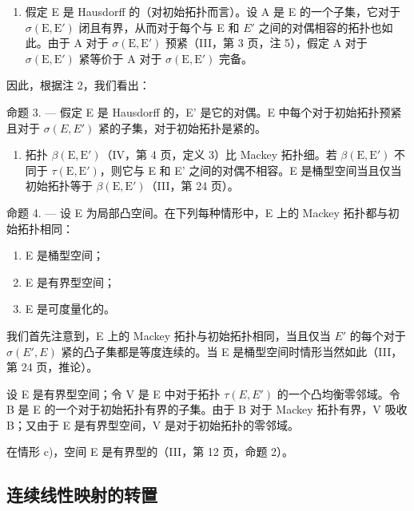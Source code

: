 \begin{enumerate}
\def\labelenumi{\arabic{enumi})}
\setcounter{enumi}{2}
\tightlist
\item
  假定 E 是 Hausdorff 的（对初始拓扑而言）。设 A 是 E 的一个子集，它对于 \(\sigma(\mathrm{E}, \mathrm{E}')\) 闭且有界，从而对于每个与 E 和 \(E'\) 之间的对偶相容的拓扑也如此。由于 A 对于 \(\sigma(\mathrm{E}, \mathrm{E}')\) 预紧（III，第 3 页，注 5），假定 A 对于 \(\sigma(\mathrm{E}, \mathrm{E}')\) 紧等价于 A 对于 \(\sigma(\mathrm{E}, \mathrm{E}')\) 完备。
\end{enumerate}

因此，根据注 2，我们看出：

命题 3. --- 假定 E 是 Hausdorff 的，E' 是它的对偶。E 中每个对于初始拓扑预紧且对于 \(\sigma(E, E')\) 紧的子集，对于初始拓扑是紧的。

\begin{enumerate}
\def\labelenumi{\arabic{enumi})}
\setcounter{enumi}{3}
\tightlist
\item
  拓扑 \(\beta(\mathrm{E},\mathrm{E}')\)（IV，第 4 页，定义 3）比 Mackey 拓扑细。若 \(\beta(\mathrm{E},\mathrm{E}')\) 不同于 \(\tau(\mathrm{E},\mathrm{E}')\)，则它与 E 和 E' 之间的对偶不相容。E 是桶型空间当且仅当初始拓扑等于 \(\beta(\mathrm{E},\mathrm{E}')\)（III，第 24 页）。
\end{enumerate}

命题 4. --- 设 E 为局部凸空间。在下列每种情形中，E 上的 Mackey 拓扑都与初始拓扑相同：

\begin{enumerate}
\def\labelenumi{\alph{enumi})}
\item
  E 是桶型空间；
\item
  E 是有界型空间；
\item
  E 是可度量化的。
\end{enumerate}

我们首先注意到，E 上的 Mackey 拓扑与初始拓扑相同，当且仅当 \(E'\) 的每个对于 \(\sigma(E', E)\) 紧的凸子集都是等度连续的。当 E 是桶型空间时情形当然如此（III，第 24 页，推论）。

设 E 是有界型空间；令 V 是 E 中对于拓扑 \(\tau(E, E')\) 的一个凸均衡零邻域。令 B 是 E 的一个对于初始拓扑有界的子集。由于 B 对于 Mackey 拓扑有界，V 吸收 B；又由于 E 是有界型空间，V 是对于初始拓扑的零邻域。

在情形 c)，空间 E 是有界型的（III，第 12 页，命题 2）。

\subsection{连续线性映射的转置}


